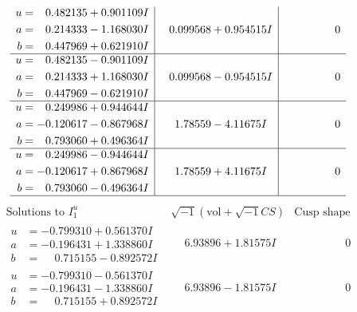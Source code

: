 \documentclass[1p]{elsarticle_modified}
\theoremstyle{definition}
\newcommand{\I}{\sqrt{-1}}
\begin{document}
$$\begin{array}{c|c|c}
\begin{aligned}
u &= \phantom{-}0.482135 + 0.901109 I \\
a &= \phantom{-}0.214333 - 1.168030 I \\
b &= \phantom{-}0.447969 + 0.621910 I\end{aligned}
 & \phantom{-}0.099568 + 0.954515 I & \phantom{-0.000000 } 0 \\ \hline\begin{aligned}
u &= \phantom{-}0.482135 - 0.901109 I \\
a &= \phantom{-}0.214333 + 1.168030 I \\
b &= \phantom{-}0.447969 - 0.621910 I\end{aligned}
 & \phantom{-}0.099568 - 0.954515 I & \phantom{-0.000000 } 0 \\ \hline\begin{aligned}
u &= \phantom{-}0.249986 + 0.944644 I \\
a &= -0.120617 - 0.867968 I \\
b &= \phantom{-}0.793060 + 0.496364 I\end{aligned}
 & \phantom{-}1.78559 - 4.11675 I & \phantom{-0.000000 } 0 \\ \hline\begin{aligned}
u &= \phantom{-}0.249986 - 0.944644 I \\
a &= -0.120617 + 0.867968 I \\
b &= \phantom{-}0.793060 - 0.496364 I\end{aligned}
 & \phantom{-}1.78559 + 4.11675 I & \phantom{-0.000000 } 0\\
 \hline 
 \end{array}$$\newpage$$\begin{array}{c|c|c}  
\text{Solutions to }I^u_{1}& \I (\text{vol} + \sqrt{-1}CS) & \text{Cusp shape}\\
 \hline 
\begin{aligned}
u &= -0.799310 + 0.561370 I \\
a &= -0.196431 + 1.338860 I \\
b &= \phantom{-}0.715155 - 0.892572 I\end{aligned}
 & \phantom{-}6.93896 + 1.81575 I & \phantom{-0.000000 } 0 \\ \hline\begin{aligned}
u &= -0.799310 - 0.561370 I \\
a &= -0.196431 - 1.338860 I \\
b &= \phantom{-}0.715155 + 0.892572 I\end{aligned}
 & \phantom{-}6.93896 - 1.81575 I & \phantom{-0.000000 } 0 \\ \hline\begin{aligned}

\end{aligned}
\end{array}$$
\end{document}
